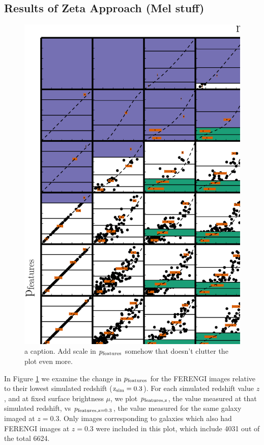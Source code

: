 \documentclass[usenatbib]{mn2e}
\begin{document}
\subsection{Results of Zeta Approach (Mel stuff)}

\begin{figure}
\begin{center}
\includegraphics[width=\textwidth]{p_vs_p_SB_redshift.ps}
\caption{a caption. Add scale in $p_{\rm features}$ somehow that doesn't clutter the plot even more. }
\label{fig:p_vs_p}
\end{center}
\end{figure}

In Figure \ref{fig:p_vs_p} we examine the change in $p_{\rm features}$ for the FERENGI images relative to their lowest simulated redshift ($\rm z_{sim}=0.3$). For each simulated redshift value $z$, and at fixed surface brightness $\mu$, we plot $p_{\rm features,z}$, the value measured at that simulated redshift, vs $p_{\rm features,z=0.3}$, the value measured for the same galaxy imaged at $z=0.3$. Only images corresponding to galaxies which also had FERENGI images at $z=0.3$ were included in this plot, which include 4031 out of the total 6624.
 
\end{document}
